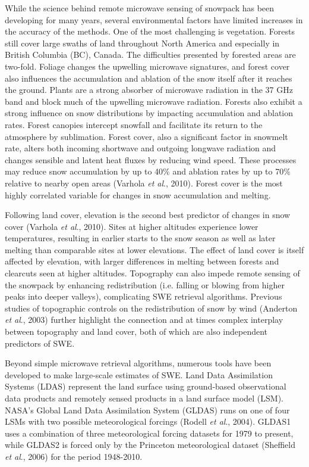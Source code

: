 \documentclass[12pt]{article}
\begin{document}
While the science behind remote microwave sensing of snowpack has been developing for many years, several environmental factors have limited increases in the accuracy of the methods. One of the most challenging is vegetation. Forests still cover large swaths of land throughout North America and especially in British Columbia (BC), Canada. The difficulties presented by forested areas are two-fold. Foliage changes the upwelling microwave signatures, and forest cover also influences the accumulation and ablation of the snow itself after it reaches the ground.  Plants are a strong absorber of microwave radiation in the 37 GHz band and block much of the upwelling microwave radiation. 
Forests also exhibit a strong influence on snow distributions by impacting accumulation and ablation rates. Forest canopies intercept snowfall and facilitate its return to the atmosphere by sublimation. Forest cover, also a significant factor in snowmelt rate, alters both incoming shortwave and outgoing longwave radiation and changes sensible and latent heat fluxes by reducing wind speed. These processes may reduce snow accumulation by up to 40\% and ablation rates by up to 70\% relative to nearby open areas (Varhola \textit{et al}., 2010).  
Forest cover is the most highly correlated variable for changes in snow accumulation and melting.

Following land cover, elevation is the second best predictor of changes in snow cover (Varhola \textit{et al}., 2010). 
Sites at higher altitudes experience lower temperatures, resulting in earlier starts to the snow season as well as later melting than comparable sites at lower elevations.  The effect of land cover is itself affected by elevation, with larger differences in melting between forests and clearcuts seen at higher altitudes. Topography can also impede remote sensing of the snowpack by enhancing redistribution (i.e. falling or blowing from higher peaks into deeper valleys), complicating SWE retrieval algorithms.
Previous studies of topographic controls on the redistribution of snow by wind (Anderton \textit{et al}., 2003) further highlight the connection and at times complex interplay between topography and land cover, both of which are also independent predictors of SWE.

Beyond simple microwave retrieval algorithms, numerous tools have been developed to make large-scale estimates of SWE.  Land Data Assimilation Systems (LDAS) represent the land surface using ground-based observational data products and remotely sensed products in a land surface model (LSM).  NASA's Global Land Data Assimilation System (GLDAS) runs on one of four LSMs with two possible meteorological forcings (Rodell \textit{et al}., 2004).  GLDAS1 uses a combination of three meteorological forcing datasets for 1979 to present, while GLDAS2 is forced only by the Princeton meteorological dataset (Sheffield \textit{et al}., 2006) for the period 1948-2010.  
\end{document}
